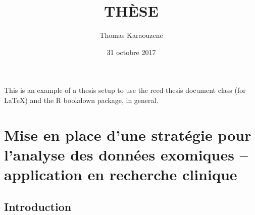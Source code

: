\documentclass[12pt,twoside]{reedthesis}
\title{THÈSE}
\author{Thomas Karaouzene}
\date{31 octobre 2017}
\theoremstyle{definition}
\theoremstyle{definition}
\theoremstyle{remark}
\begin{document}
      \maketitle
  
  \frontmatter %
  \pagestyle{empty} %

  
      \begin{preface}
      This is an example of a thesis setup to use the reed thesis document
      class (for LaTeX) and the R bookdown package, in general.
    \end{preface}
  
      \hypersetup{linkcolor=black}
    \setcounter{tocdepth}{3}
    \tableofcontents
  
      \listoftables
  
      \listoffigures
  
  
  
  \mainmatter %
  \pagestyle{fancyplain} %

  \chapter{Mise en place d'une stratégie pour l'analyse des données
  exomiques -- application en recherche
  clinique}\label{mise-en-place-dune-strategie-pour-lanalyse-des-donnees-exomiques-application-en-recherche-clinique}
  
  \newpage
  
  \section{Introduction}\label{introduction}
  
\end{document}
